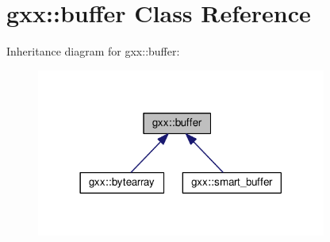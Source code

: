 \hypertarget{classgxx_1_1buffer}{}\section{gxx\+:\+:buffer Class Reference}
\label{classgxx_1_1buffer}


Inheritance diagram for gxx\+:\+:buffer\+:
\nopagebreak
\begin{figure}[H]
\begin{center}
\leavevmode
\includegraphics[width=270pt]{classgxx_1_1buffer__inherit__graph}
\end{center}
\end{figure}
